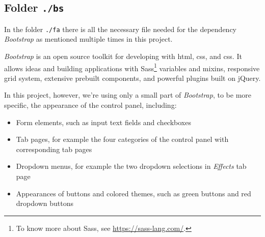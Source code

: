 \subsection{Folder \texttt{./bs}}

In the folder \texttt{./fa} there is all the necessary file needed for the dependency \emph{Bootstrap} as mentioned multiple times in this project.

\emph{Bootstrap} is an open source toolkit for developing with \gls{html}, \gls{css}, and \gls{css}. It allows ideas and building applications with Sass\footnote{ To know more about Sass, see \url{https://sass-lang.com/}.} variables and mixins, responsive grid system, extensive prebuilt components, and powerful plugins built on jQuery.

In this project, however, we're using only a small part of \emph{Bootstrap}, to be more specific, the appearance of the control panel, including:

\begin{itemize}
  \item Form elements, such as input text fields and checkboxes
  \item Tab pages, for example the four categories of the control panel with corresponding tab pages
  \item Dropdown menus, for example the two dropdown selections in \emph{Effects} tab page
  \item Appearances of buttons and colored themes, such as green buttons and red dropdown buttons
\end{itemize}